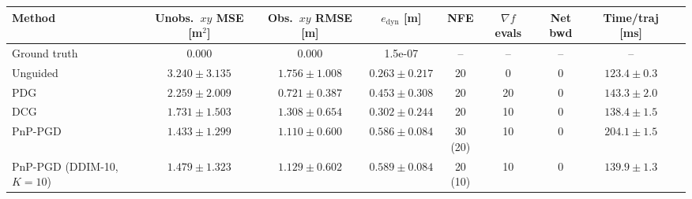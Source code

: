 \begin{tabular}{lcccccccc}
\toprule
Method & Unobs.\ $xy$ MSE [m$^2$] & Obs.\ $xy$ RMSE [m] & $e_{\mathrm{dyn}}$ [m] & NFE & $\nabla f$ evals & Net bwd & Time/traj [ms] \\
\midrule
Ground truth & 0.000 & 0.000 & 1.5e-07 & -- & -- & -- & -- \\
Unguided & $3.240 \pm 3.135$ & $1.756 \pm 1.008$ & $0.263 \pm 0.217$ & 20 & 0 & 0 & $123.4 \pm 0.3$ \\
PDG & $2.259 \pm 2.009$ & $0.721 \pm 0.387$ & $0.453 \pm 0.308$ & 20 & 20 & 0 & $143.3 \pm 2.0$ \\
DCG & $1.731 \pm 1.503$ & $1.308 \pm 0.654$ & $0.302 \pm 0.244$ & 20 & 10 & 0 & $138.4 \pm 1.5$ \\
PnP-PGD & $1.433 \pm 1.299$ & $1.110 \pm 0.600$ & $0.586 \pm 0.084$ & 30 (20) & 10 & 0 & $204.1 \pm 1.5$ \\
PnP-PGD (DDIM-10, $K{=}10$) & $1.479 \pm 1.323$ & $1.129 \pm 0.602$ & $0.589 \pm 0.084$ & 20 (10) & 10 & 0 & $139.9 \pm 1.3$ \\
\bottomrule
\end{tabular}
